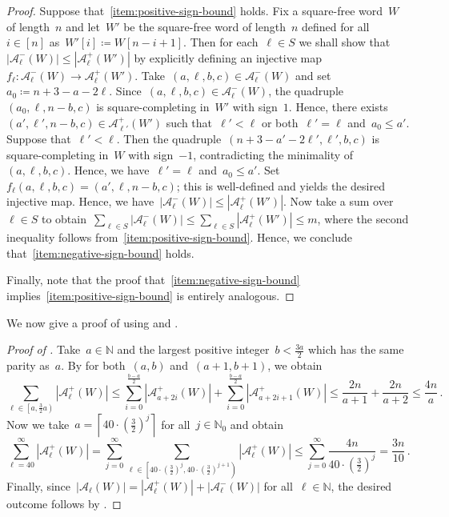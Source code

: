 \documentclass[12pt]{article}
\theoremstyle{plain}
\theoremstyle{definition}
\newcommand{\ceil}[1]{\left\lceil#1\right\rceil}
\newcommand\N{\mathbb{N}}
\newcommand{\coleq}{\coloneq}
\newcommand{\cA}{\mathcal A}
\newcommand{\abs}[1]{\mathopen{}\left\lvert#1\right\rvert\mathclose{}}
\begin{document}
	\begin{proof}
		Suppose that~\ref{item:positive-sign-bound} holds. Fix a square-free word~$W$ of length~$n$ and let~$W'$ be the square-free word of length~$n$ defined for all~$i\in[n]$ as~$W'[i]\coleq W[n-i+1]$. Then for each~$\ell\in S$ we shall show that~$\abs{\cA^{-}_{\ell}(W)}\le\abs{\cA^{+}_{\ell}(W')}$ by explicitly defining an injective map~$f_\ell\colon\cA^{-}_{\ell}(W)\to\cA^{+}_{\ell}(W')$. Take~$(a,\ell,b,c)\in\cA^{-}_{\ell}(W)$ and set~$a_0\coleq n+3-a-2\ell$. Since~$(a,\ell,b,c)\in\cA^{-}_{\ell}(W)$, the quadruple~$(a_0,\ell,n-b,c)$ is square-completing in~$W'$ with sign~$1$. Hence, there exists $(a',\ell',n-b,c)\in\cA^{+}_{\ell'}(W')$ such that~$\ell'<\ell$ or both~$\ell'=\ell$ and~$a_0\le a'$. Suppose that~$\ell'<\ell$. Then the quadruple~$(n+3-a'-2\ell',\ell',b,c)$ is square-completing in~$W$ with sign~$-1$, contradicting the minimality of~$(a,\ell,b,c)$. Hence, we have~$\ell'=\ell$ and~$a_0\le a'$. Set~$f_{\ell}(a,\ell,b,c)=(a',\ell,n-b,c)$; this is well-defined and yields the desired injective map. Hence, we have~$\abs{\cA^{-}_{\ell}(W)}\le\abs{\cA^{+}_{\ell}(W')}$. Now take a sum over~$\ell\in S$ to obtain~$\sum_{\ell\in S}\abs{\cA^{-}_{\ell}(W)} \le \sum_{\ell\in S}\abs{\cA^{+}_{\ell}(W')} \le m$, where the second inequality follows from~\ref{item:positive-sign-bound}. Hence, we conclude that~\ref{item:negative-sign-bound} holds.
		
		Finally, note that the proof that~\ref{item:negative-sign-bound} implies~\ref{item:positive-sign-bound} is entirely analogous.
	\end{proof}
	
	We now give a proof of  using  and .
	
	\begin{proof}[Proof of ]
		Take~$a\in\N$ and the largest positive integer~$b<\frac{3a}{2}$ which has the same parity as~$a$. By  for both~$(a,b)$ and~$(a+1,b+1)$, we obtain
		\[ \sum_{\ell\in \left[a,\frac{3}{2}a\right)}\abs{\cA^{+}_\ell(W)} \le \sum_{i=0}^{\frac{b-a}{2}}\abs{\cA^{+}_{a+2i}(W)} + \sum_{i=0}^{\frac{b-a}{2}}\abs{\cA^{+}_{a+2i+1}(W)} \le \frac{2n}{a+1} + \frac{2n}{a+2} \le \frac{4n}{a}\,. \]
		Now we take~$a=\ceil{40\cdot\left(\frac{3}{2}\right)^j}$ for all~$j\in\N_0$ and obtain
		\begin{equation*}
			\sum_{\ell=40}^\infty\abs{\cA^{+}_\ell(W)} = \sum_{j=0}^\infty\sum_{\ell\in\left[40\cdot \left(\frac{3}{2}\right)^j,40\cdot \left(\frac{3}{2}\right)^{j+1}\right)}\abs{\cA^{+}_\ell(W)}\le \sum_{j=0}^\infty\frac{4n}{40\cdot\left(\frac32\right)^j} =\frac{3n}{10}\,.
		\end{equation*}
		Finally, since~$\abs{\cA_\ell(W)}=\abs{\cA^{+}_\ell(W)}+\abs{\cA^{-}_\ell(W)}$ for all~$\ell\in\N$, the desired outcome follows by .
	\end{proof}
	
\end{document}

